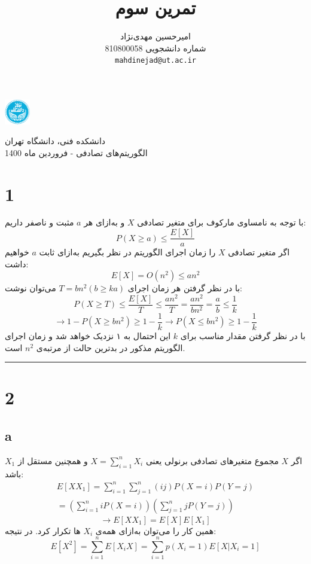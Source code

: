 \documentclass{article}
\title{
تمرین سوم
}
\author{%
  امیرحسین مهدی‌نژاد\\
  شماره دانشجویی 810800058\\
  \texttt{mahdinejad@ut.ac.ir} \\
}
\begin{document}
\begin{minipage}{0.1\textwidth}%
\includegraphics[width=1.1cm]{Photos/UT_logo.png}
\end{minipage}%
\hfill%
\begin{minipage}{0.9\textwidth}\raggedleft
دانشکده فنی، دانشگاه تهران\\
الگوریتم‌های تصادفی -  
فروردین
ماه 1400\\
\end{minipage}

\makepertitle

\section*{1}
با توجه به نامساوی مارکوف برای متغیر تصادفی
$X$
و به‌ازای هر
$a$
مثبت و ناصفر داریم:
$$P( X\geq a) \leq \dfrac{E\left[ X\right] }{a}$$
اگر متغیر تصادفی
$X$
را زمان اجرای الگوریتم در نظر بگیریم به‌ازای ثابت
$a$
خواهیم داشت:
$$E\left[ X\right] =O\left( n^{2}\right) \leq an^{2}$$
با در نظر گرفتن هر زمان اجرای
$T=bn^2 (b\geq ka)$
می‌توان نوشت:
$$P( X\geq T) \leq \dfrac{E\left[ X\right] }{T}\leq \dfrac{an^{2}}{T}=\dfrac{an^{2}}{bn^{2}}=\dfrac{a}{b}\leq \frac{1}{k}$$
$$\rightarrow 1-P( X\geq bn^{2}) \geq 1-\dfrac{1}{k}\rightarrow P\left( X\leq bn^{2}\right) \geq 1-\dfrac{1}{k}$$
با در نظر گرفتن مقدار مناسب برای
$k$
این احتمال به ۱ نزدیک خواهد شد و زمان اجرای الگوریتم مذکور در بدترین حالت از مرتبه‌ی 
$n^2$
است.

\rule{\linewidth}{1pt}
\section*{2}
\subsection*{a}
اگر 
$X$
مجموع متغیر‌های تصادفی برنولی یعنی
$X=\sum ^{n}_{i=1}X_{i}$
و همچنین مستقل از
$X_1$
باشد:
$$\begin{aligned}E\left[ XX_{1}\right] =\sum ^{n}_{i=1}\sum ^{n}_{j=1}\left( ij\right) P\left( X=i\right) P\left( Y=j\right) \\ =\left( \sum ^{n}_{i=1}iP\left( X=i\right) \right) \left( \sum ^{n}_{j=1}jP\left( Y=j\right) \right) \end{aligned}$$
$$\rightarrow E\left[ XX_{1}\right] =E\left[ X\right] E\left[ X_{1}\right]$$
همین کار را می‌توان به‌ازای همه‌ی
$X_i$
ها تکرار کرد. در نتیجه:
$$E\left[ X^{2}\right] =\sum ^{n}_{i=1}E\left[ X_{i}X\right] =\sum ^{n}_{i=1}p( X_{i}= 1) E[ X| X_{i}= 1]$$
\end{document}
